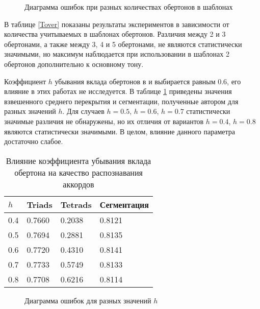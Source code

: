 \begin{figure}[htbp]
  \begin{minipage}[h]{0.49\linewidth}
  \end{minipage}
  \hfill
  \begin{minipage}[h]{0.49\linewidth}
  \end{minipage}
  \caption{Диаграмма ошибок при разных количествах обертонов в шаблонах}
  \label{img:nHarm}
\end{figure}

В таблице \ref{Tover} показаны результаты экспериментов в зависимости от
количества учитываемых в шаблонах обертонов. Различия между 2 и 3 обертонами, а
также между 3, 4 и 5 обертонами, не являются статистически значимыми, но
максимум наблюдается при использовании в шаблонах 2 обертонов дополнительно к
основному тону.

Коэффициент $h$ убывания вклада обертонов в \cite{Gomez2006} и \cite{Oudre2009}
выбирается равным 0.6, его влияние в этих работах не исследуется. В таблице
\ref{Th} приведены значения взвешенного среднего перекрытия и сегментации,
полученные автором для разных значений $h$. Для случаев $h=0.5$, $h=0.6$,
$h=0.7$ статистически значимые различия не обнаружены, но их отличия от
вариантов $h=0.4$, $h=0.8$ являются статистически значимыми. В целом, влияние
данного параметра достаточно слабое.

\begin{table} [htbp]
  \centering
  \parbox{15cm}{\caption{Влияние коэффициента убывания вклада обертона на
  качество распознавания аккордов} \label{Th}}
  \begin{tabular}{|l|l|l|l|}
  \hline
  $h$ & Triads & Tetrads & Сегментация \\
  \hline
  0.4 & 0.7660 & 0.2038 & 0.8121 \\
  0.5 & 0.7694 & 0.2881 & 0.8135 \\
  0.6 & 0.7720 & 0.4310 & 0.8141 \\
  0.7 & 0.7733 & 0.5749 & 0.8133 \\
  0.8 & 0.7708 & 0.6216 & 0.8114 \\
  \hline
  \end{tabular}
\end{table}

\begin{figure}[htbp]
  \begin{minipage}[h]{0.49\linewidth}
  \end{minipage}
  \hfill
  \begin{minipage}[h]{0.49\linewidth}
  \end{minipage}
  \caption{Диаграмма ошибок для разных значений $h$}
  \label{img:h}
\end{figure}

